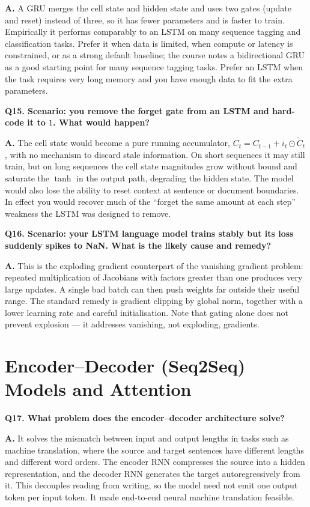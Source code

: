 \documentclass[11pt]{article}
\begin{document}
\noindent\textbf{A.} A GRU merges the cell state and hidden state and uses two gates (update and reset) instead of three, so it has fewer parameters and is faster to train. Empirically it performs comparably to an LSTM on many sequence tagging and classification tasks. Prefer it when data is limited, when compute or latency is constrained, or as a strong default baseline; the course notes a bidirectional GRU as a good starting point for many sequence tagging tasks. Prefer an LSTM when the task requires very long memory and you have enough data to fit the extra parameters.

\medskip
\noindent\textbf{Q15. Scenario: you remove the forget gate from an LSTM and hard-code it to $1$. What would happen?}

\noindent\textbf{A.} The cell state would become a pure running accumulator, $C_t = C_{t-1} + i_t \odot \tilde{C}_t$, with no mechanism to discard stale information. On short sequences it may still train, but on long sequences the cell state magnitudes grow without bound and saturate the $\tanh$ in the output path, degrading the hidden state. The model would also lose the ability to reset context at sentence or document boundaries. In effect you would recover much of the ``forget the same amount at each step'' weakness the LSTM was designed to remove.

\medskip
\noindent\textbf{Q16. Scenario: your LSTM language model trains stably but its loss suddenly spikes to NaN. What is the likely cause and remedy?}

\noindent\textbf{A.} This is the exploding gradient counterpart of the vanishing gradient problem: repeated multiplication of Jacobians with factors greater than one produces very large updates. A single bad batch can then push weights far outside their useful range. The standard remedy is gradient clipping by global norm, together with a lower learning rate and careful initialisation. Note that gating alone does not prevent explosion --- it addresses vanishing, not exploding, gradients.

\section{Encoder--Decoder (Seq2Seq) Models and Attention}

\noindent\textbf{Q17. What problem does the encoder--decoder architecture solve?}

\noindent\textbf{A.} It solves the mismatch between input and output lengths in tasks such as machine translation, where the source and target sentences have different lengths and different word orders. The encoder RNN compresses the source into a hidden representation, and the decoder RNN generates the target autoregressively from it. This decouples reading from writing, so the model need not emit one output token per input token. It made end-to-end neural machine translation feasible.
\end{document}
